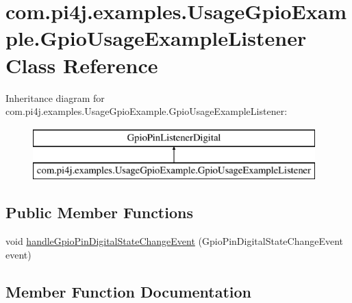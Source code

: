 \hypertarget{classcom_1_1pi4j_1_1examples_1_1UsageGpioExample_1_1GpioUsageExampleListener}{}\section{com.\+pi4j.\+examples.\+Usage\+Gpio\+Example.\+Gpio\+Usage\+Example\+Listener Class Reference}
\label{classcom_1_1pi4j_1_1examples_1_1UsageGpioExample_1_1GpioUsageExampleListener}
Inheritance diagram for com.\+pi4j.\+examples.\+Usage\+Gpio\+Example.\+Gpio\+Usage\+Example\+Listener\+:\begin{figure}[H]
\begin{center}
\leavevmode
\includegraphics[height=2.000000cm]{classcom_1_1pi4j_1_1examples_1_1UsageGpioExample_1_1GpioUsageExampleListener}
\end{center}
\end{figure}
\subsection*{Public Member Functions}
\begin{DoxyCompactItemize}
\item 
void \hyperlink{classcom_1_1pi4j_1_1examples_1_1UsageGpioExample_1_1GpioUsageExampleListener_a5cae5b046b260a1a2f8090366270d821}{handle\+Gpio\+Pin\+Digital\+State\+Change\+Event} (Gpio\+Pin\+Digital\+State\+Change\+Event event)
\end{DoxyCompactItemize}


\subsection{Member Function Documentation}
\hypertarget{classcom_1_1pi4j_1_1examples_1_1UsageGpioExample_1_1GpioUsageExampleListener_a5cae5b046b260a1a2f8090366270d821}{}
